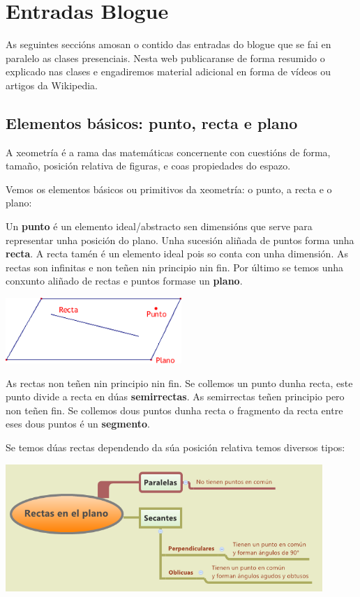 \section{Entradas Blogue}\label{fich:blogue}

As seguintes seccións amosan o contido das entradas do blogue que se fai en paralelo as clases presenciais. Nesta web publicaranse de forma resumido o explicado nas clases e engadiremos material adicional en forma de vídeos ou artigos da Wikipedia.

\subsection{Elementos básicos: punto, recta e plano}

A xeometría é a rama das matemáticas concernente con cuestións de forma, tamaño, posición relativa de figuras, e coas propiedades do espazo.

Vemos os elementos básicos ou primitivos da xeometría: o punto, a recta e o plano:

Un \textbf{punto} é un elemento ideal/abstracto sen dimensións que serve para representar unha posición do plano. Unha sucesión aliñada de puntos forma unha \textbf{recta}. A recta tamén é un elemento ideal pois so conta con unha dimensión. As rectas son infinitas e non teñen nin principio nin fin. Por último se temos unha conxunto aliñado de rectas e puntos formase un \textbf{plano}.

\begin{center}
    \includegraphics[width=0.5\textwidth]{img/puntorectaplano.png}
\end{center}

As rectas non teñen nin principio nin fin. Se collemos un punto dunha recta, este punto divide a recta en dúas \textbf{semirrectas}. As semirrectas teñen principio pero non teñen fin. Se collemos dous puntos dunha recta o fragmento da recta entre eses dous puntos é un \textbf{segmento}.

Se temos dúas rectas dependendo da súa posición relativa temos diversos tipos:

\begin{center}
    \includegraphics[width=0.9\textwidth]{img/tiposrectas.png}
\end{center}

